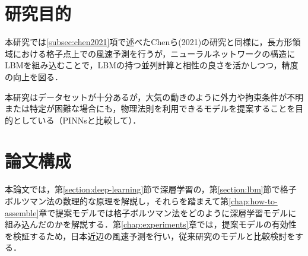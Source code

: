 



\section{研究目的}
本研究では\ref{subsec:chen2021}項で述べたChenら(2021)の研究と同様に，長方形領域における格子点上での風速予測を行うが，ニューラルネットワークの構造にLBMを組み込むことで，LBMの持つ並列計算と相性の良さを活かしつつ，精度の向上を図る．

本研究はデータセットが十分あるが，大気の動きのように外力や拘束条件が不明または特定が困難な場合にも，物理法則を利用できるモデルを提案することを目的としている（PINNsと比較して）．%

\section{論文構成}
本論文では，第\ref{section:deep-learning}節で深層学習の，第\ref{section:lbm}節で格子ボルツマン法の数理的な原理を解説し，それらを踏まえて第\ref{chap:how-to-assemble}章で提案モデルでは格子ボルツマン法をどのように深層学習モデルに組み込んだのかを解説する．第\ref{chap:experiments}章では，提案モデルの有効性を検証するため，日本近辺の風速予測を行い，従来研究のモデルと比較検討をする．
